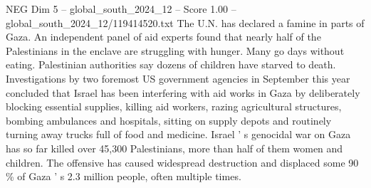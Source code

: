 \begin{textsample}{NEG Dim 5 – global\_south\_2024\_12 – Score 1.00 – global\_south\_2024\_12/119414520.txt}
The U.N. has declared a famine in parts of Gaza.
An independent panel of aid experts found that nearly half of the Palestinians in the enclave are struggling with hunger.
Many go days without eating.
Palestinian authorities say dozens of children have starved to death.
Investigations by two foremost US government agencies in September this year concluded that Israel has been interfering with aid works in Gaza by deliberately blocking essential supplies, killing aid workers, razing agricultural structures, bombing ambulances and hospitals, sitting on supply depots and routinely turning away trucks full of food and medicine.
Israel ' s genocidal war on Gaza has so far killed over 45,300 Palestinians, more than half of them women and children.
The offensive has caused widespread destruction and displaced some 90 \% of Gaza ' s 2.3 million people, often multiple times.

\end{textsample}
